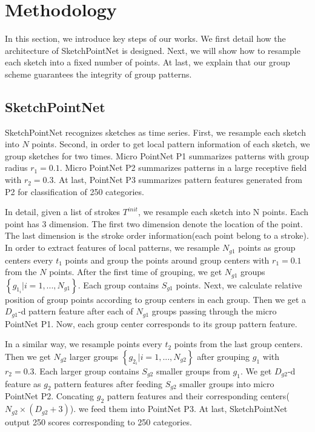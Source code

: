\section{Methodology}
\label{sec:methodology}

In this section, we introduce key steps of our works. We first detail how the architecture of SketchPointNet is designed. Next, we will show how to resample each sketch into a fixed number of points. At last, we explain that our group scheme guarantees the integrity of group patterns.

\subsection{SketchPointNet}
\label{ssec:sketch_point_net}

SketchPointNet recognizes sketches as time series. First, we resample each sketch into $N$ points. Second, in order to get local pattern information of each sketch, we group sketches for two times. Micro PointNet P1 summarizes patterns with group radius $r_1 = 0.1$. Micro PointNet P2 summarizes patterns in a large receptive field with $r_2 = 0.3$. At last, PointNet P3 summarizes pattern features generated from P2 for classification of 250 categories.

In detail, given a list of strokes $T^{init}$, we resample each sketch into N points. Each point has 3 dimension. The first two dimension denote the location of the point. The last dimension is the stroke order information(each point belong to a stroke). In order to extract features of local patterns, we resample $N_{g1}$ points as group centers every $t_1$ points and group the points around group centers with $r_1 = 0.1$ from the $N$ points. After the first time of grouping, we get $N_{g1}$ groups $\left\{ g_{1_i}| i = 1, ..., N_{g1} \right\}$. Each group contains $S_{g1}$ points. Next, we calculate relative position of group points according to group centers in each group. Then we get a $D_{g1}$-d pattern feature after each of $N_{g1}$ groups passing through the micro PointNet P1. Now, each group center corresponds to its group pattern feature.

In a similar way, we resample points every $t_2$ points from the last group centers. Then we get $N_{g2}$ larger groups $\left\{ g_{2_i}| i = 1, ..., N_{g2} \right\}$ after grouping $g_1$ with $r_2 = 0.3$. Each larger group contains $S_{g2}$ smaller groups from $g_1$. We get $D_{g2}$-d feature as $g_2$ pattern features after feeding $S_{g2}$ smaller groups into micro PointNet P2. Concating $g_2$ pattern features and their corresponding centers($N_{g2} \times (D_{g2}+3)$). we feed them into PointNet P3. At last, SketchPointNet output 250 scores corresponding to 250 categories.

